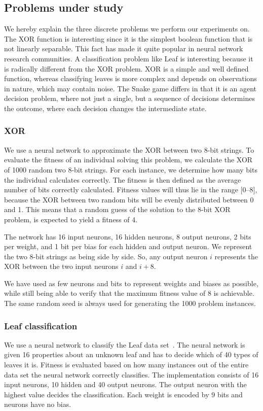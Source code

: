 \subsection{Problems under study}
\label{sec:problems}
We hereby explain the three discrete problems we perform our experiments on. 
The XOR function is interesting since it is the simplest boolean function that is not linearly separable. This fact has made it quite popular in neural network research communities\cite{masterThesisGANN}. A classification problem like Leaf is interesting because it is radically different from the XOR problem. XOR is a simple and well defined function, whereas classifying leaves is more complex and depends on observations in nature, which may contain noise. The Snake game differs in that it is an agent decision problem, where not just a single, but a sequence of decisions determines the outcome, where each decision changes the intermediate state.

\subsubsection{XOR}
We use a neural network to approximate the XOR between two 8-bit strings.
To evaluate the fitness of an individual solving this problem, we calculate the XOR of \num{1000} random two 8-bit strings.
For each instance, we determine how many bits the individual calculates correctly.
The fitness is then defined as the average number of bits correctly calculated.
Fitness values will thus lie in the range $[0$--$8]$, because the XOR between two random bits will be evenly distributed between 0 and 1. This means that a random guess of the solution to the 8-bit XOR problem, is expected to yield a fitness of 4.

The network has 16 input neurons, 16 hidden neurons, 8 output neurons, 2 bits per weight, and 1 bit per bias for each hidden and output neuron. We represent the two 8-bit strings as being side by side. So, any output neuron $i$ represents the XOR between the two input neurons $i$ and $i+8$. 

We have used as few neurons and bits to represent weights and biases as possible, while still being able to verify that the maximum fitness value of 8 is achievable.
The same random seed is always used for generating the 1000 problem instances.

\subsubsection{Leaf classification}
We use a neural network to classify the Leaf data set~\cite{Bache+Lichman:2013, leafdataset}.
The neural network is given 16 properties about an unknown leaf and has to decide which of 40 types of leaves it is.
Fitness is evaluated based on how many instances out of the entire data set the neural network correctly classifies.
The implementation consists of 16 input neurons, 10 hidden and 40 output neurons. The output neuron with the highest value decides the classification. Each weight is encoded by 9 bits and neurons have no bias.

